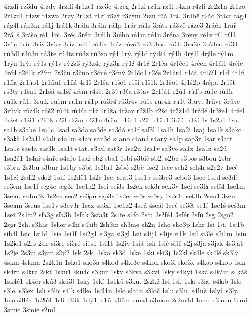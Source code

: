 4rzdi
rz3du
4rzdy
4rzdí
4r1ze1
rze3c
4rzeg
2r1zi
rz1k
rz1l
r4zla
r4zli
2r2z1n
2r1zo
2r1zu1
r4zw
r4zwa
2rzy
2r1zá
r1zí
r3zý
r3zým
2rzů
r2á
1rá.
3rábě
r2ác
3ráct
rág4
rág4l
ráh3m
rá1j
1rá1k
3rála
3ráln
rá1p
1rár
rá1s
3ráts
rá3vě
ráze3
3ráčn
1rář
2rá1š
3rášo
ré1
1ré.
3réc
3réci
3ré1h
3rého
ré1m
ré1n
3réna
3rény
ré1v
rí1
rí1l
3rílo
1rín
3rív
3rívr
3ríz.
ró4f
ró4fa
1róz
rózá3
rú3
3rú.
rú3b
3rú3c
3rú3ca
rú3d
rú3dl
r3ú3n
rú3te
rú4ts
rú3z
rú3zo
rý1
1rý.
rý1d
rýdš4
rý1h
4rý1l
4rýle
rý1m
1rýn
1rýr
rý1s
rý1v
rý2z3
rý3z4e
rýz3n
rý1ž
4r1č
2r1ča
4r1če1
4rčen
4r1či1
4rčic
4rčil
r2č1k
r2čm
2r3čn
r3čno
r3čné
r3čný
2r1čo1
r2čs
2r1ču1
r1čá
4r1čí1
r1ď
4r1ň
r1ňa
2r1ňo1
2r1ňu1
r1ňá
4r1š
2r1ša
r1še1
r1ši
r1š1k
2r1šo1
4r1š2p
4ršpa
2r1št
rš3ty
r1šu1
2r1šá
4r1ší
4ršín
r4šč.
2r3ť
r3ťa
r3ťav
2r1ťá1
r2ů1
rů1b
rů1c
rů1h
rů1k
rů1l
3růlk
rů1m
rů1n
rů1p
rů3r4
rů3r4v
rů1s
růs4k
rů1t
3rův.
3růvc
3růve
3růvk
růz4k
růš2
rů4ť
rů4ťa
r1ž
4r1ža
4ržav
r2ž1b
r2žc
4r2ž1d
4rždě
4r3že1
4ržel
4ržet
r1ži1
r2ž1k
r2žl
r2žm
r2ž1n
4ržní
r1žo1
r2žt
r1žu1
3ržál
r1ží
1s
1s2a1
1sa.
sa1b
s3abe
1sa1c
1sad
sa3da
sa3de
sa3dá
sa1f
saf3l
1sa1h
1sa2i
1saj
1sa1k
s3akc
s3akč
1s2a1l
s4ali
s4a1m
s4an
san3d
s4ano
s4aná
s4aný
sa1p
sap3r
1sar
s3art
1sa1s
sas4a
sas3k
1sa1t
s4at.
s3atl
sat3r
1sa2u
1sa1v
sa3vo
sa1x
1sa1z
sa2ú
1sa2č1
1s4ař
s4aře
s4ařo
1saž
sb2
sba1
1sbi
s3bič
sb2l
s2bo
s3bos
s3bou
2sbr
s3brü
2s3bu
s3bur
1s1by
s3bá
1s2bí1
2sbó
s2bě
1sc2
1sce
sch2
sch4r
s2c2v
1scé
1s1cí
2sdi2
sdo2
1sdí
1s2dě1
1s2e
1se.
seat3
1se1b
se3be3
sebo3
1sec
1sed
se3dř
se3em
1se1f
seg4e
seg3r
1se1h2
1sei
sei3s
1s2ek
sek3r
sek3v
1sel
se3lh
selš4
1se1m
3sem.
se4m3k
1s2en
seo2
se3pn
sep3s
1s2er
se3s
se3sy
1s2e1t
set3h
2seu1
3seu.
3seum
3seus
1se1v
s3ev3r
1sex
se3xi
1se1z2
4seá
4seál
1seč
se3čt
se1ř
1se1š
seš3m
1sež
2s1fa2
sfa3g
sfa3h
3sfak
3sfa3t
2s1fe
s1fo
2sfu
3s2fé1
3sfér
2sfú
2sg
2sgo2
2sgr
2sh.
s3has
3sher
s4hi
s4hib
2sh3m
sh3me
sh2n
1sho
sho3p
1shr
1si
1si.
1si1b
sib4l
1sic
1si1d
1sie
1si1f
1si2g1
si3ga
si3gl
1sii
s4ij1
s4ijs
si1k
1sil
si3le
s2i1m
1sin
1s2io1
s2ip
2sir
si3re
si3ré
si1s1
1si1t
1s2iv
1siá
1sií
1sič
si1ř
s2j
s3ja
s3jak
4s3jat
1s2je
2s3ju
s3jun
s2jí2
1sk
2sk.
1ska
sk3d
1ske
1ski
ski3j
1s2kl
sk4le
sk4lé
sk3lý
4skm
4skma
2s2k1n
1sko1
sko3a
s4kod
s4ko3e
s4koh
sko3i
sko3k
s4koo
s4kop
1skr
sk4rn
s4krz
2skt
1sku1
sku4c
s3kur
1skv
s3kva
s3kvi
1sky
s4kyt
1ská
s4kám
s4káš
1sk4é1
sk4ér
skú3
skú3t
1ský
1skř
1s1ků
s3ků.
2s2kž
1sl
1sl.
1sla
s3la.
s4lab
1sle
s3le.
s3lex
1sli
s3lic
s4lk
s4lko
1s4l1n
1slo
slo4u
s3loč
1slu
s3lu.
s4luž
1sly1
s3ly.
1slá
s3lák
1s2lé1
1slí
s3lík
1slý1
sl1ň
s3lům
sma1
s3man
2s2m1d
1sme
s3men
2smi
3smic
3smie
s2ml
